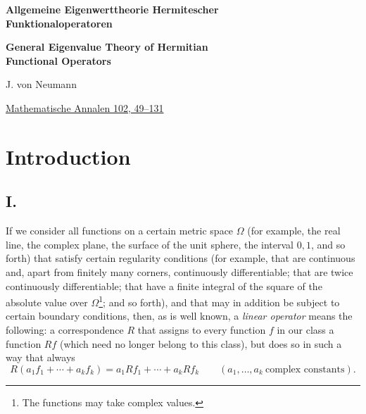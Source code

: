 ﻿\documentclass[paper=b5,fontsize=13pt,bookmarkpackage=false,twoside]{scrartcl}
\begin{document}

\begin{center}
  \vspace*{0.5\baselineskip}
  {\LARGE\bfseries
    Allgemeine Eigenwerttheorie Hermitescher\\
    Funktionaloperatoren\par}
  \vspace{0.65\baselineskip}
  {\Large\bfseries
    General Eigenvalue Theory of Hermitian\\
    Functional Operators\par}
  \vspace{0.7\baselineskip}
  {\large J. von Neumann\par}
  \vspace{0.35\baselineskip}
  {\normalsize
   \href{https://doi.org/10.1007/BF01782338}
   {Mathematische Annalen 102, 49--131}\par}
\end{center}
\vspace{0.6\baselineskip}

\section*{Introduction}\label{sec:introduction}

\subsection*{I.}\label{intro:I}

If we consider all functions on a certain metric space $\Omega$ (for example, the real line, the complex plane, the surface of the unit sphere, the interval $0,1$, and so forth) that satisfy certain regularity conditions (for example, that are continuous and, apart from finitely many corners, continuously differentiable; that are twice continuously differentiable; that have a finite integral of the square of the absolute value over $\Omega$\footnote{\label{fn:source-1}The functions may take complex values.}; and so forth), and that may in addition be subject to certain boundary conditions, then, as is well known, a \emph{linear operator} means the following: a correspondence $R$ that assigns to every function $f$ in our class a function $Rf$ (which need no longer belong to this class), but does so in such a way that always
\[
 R(a_1f_1+\cdots+a_kf_k)
 =a_1Rf_1+\cdots+a_kRf_k
 \qquad
 (a_1,\ldots,a_k\ \text{complex constants}).
\]
\end{document}
